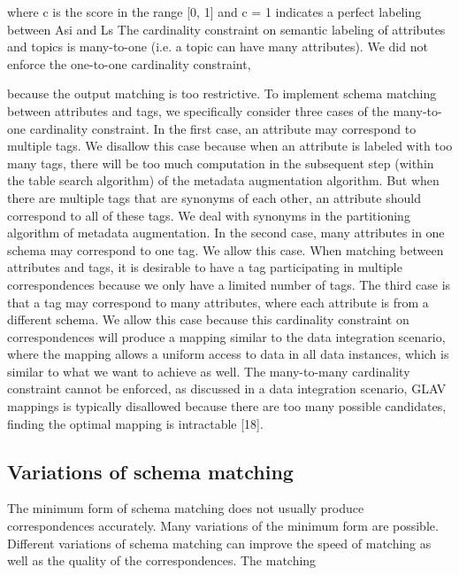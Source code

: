where c is the score in the range [0, 1] and c = 1 indicates a perfect labeling between Asi and Ls
The cardinality constraint on semantic labeling of attributes and topics is many-to-one (i.e. a topic can have many attributes). We did not enforce the one-to-one cardinality constraint,

because the output matching is too restrictive. To implement schema matching between attributes and tags, we specifically consider three cases of the many-to-one cardinality constraint.
In the first case, an attribute may correspond to multiple tags. We disallow this case because when an attribute is labeled with too many tags, there will be too much computation in the subsequent step (within the table search algorithm) of the metadata augmentation algorithm. But when there are multiple tags that are synonyms of each other, an attribute should correspond to all of these tags. We deal with synonyms in the partitioning algorithm of metadata augmentation. In the second case, many attributes in one schema may correspond to one tag. We allow this case. When matching between attributes and tags, it is desirable to have a tag participating in multiple correspondences because we only have a limited number of tags. The third case is that a tag may correspond to many attributes, where each attribute is from a different schema. We allow this case because this cardinality constraint on correspondences will produce a mapping similar to the data integration scenario, where the mapping allows a uniform access to data in all data instances, which is similar to what we want to achieve as well. The many-to-many cardinality constraint cannot be enforced, as discussed in a data integration scenario, GLAV mappings is typically disallowed because there are too many possible candidates, finding the optimal mapping is intractable [18].

\subsection{Variations of schema matching}
\label{ssec:VariationsOfSchemaMatching}

The minimum form of schema matching does not usually produce correspondences accurately. Many variations of the minimum form are possible. Different variations of schema matching can improve the speed of matching as well as the quality of the correspondences. The matching

